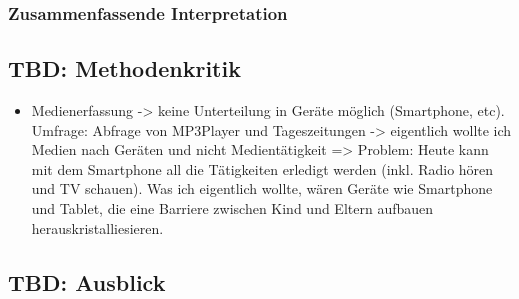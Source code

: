 \subsubsection{Zusammenfassende Interpretation}

\subsection{TBD: Methodenkritik} \label{sec:Methodenkritik}
\begin{itemize}
    \item Medienerfassung -> keine Unterteilung in Geräte möglich (Smartphone, etc). Umfrage: Abfrage von MP3Player und Tageszeitungen -> eigentlich wollte ich Medien nach Geräten und nicht Medientätigkeit => Problem: Heute kann mit dem Smartphone all die Tätigkeiten erledigt werden (inkl. Radio hören und TV schauen). Was ich eigentlich wollte, wären Geräte wie Smartphone und Tablet, die eine Barriere zwischen Kind und Eltern aufbauen herauskristalliesieren.
\end{itemize}

\subsection{TBD: Ausblick} \label{sec:Ausblick}